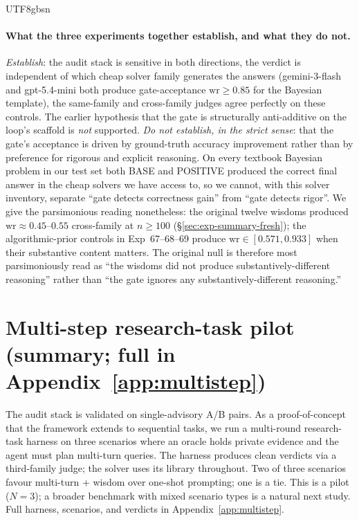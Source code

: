 \documentclass{article}
\begin{document}
\begin{CJK*}{UTF8}{gbsn}
\paragraph{What the three experiments together establish, and
what they do not.} \emph{Establish}: the audit stack is
sensitive in both directions, the verdict is independent of
which cheap solver family generates the answers
(gemini-3-flash and gpt-5.4-mini both produce gate-acceptance
\(\mathrm{wr} \geq 0.85\) for the Bayesian template), the
same-family and cross-family judges agree perfectly on these
controls. The earlier hypothesis that the gate is structurally
anti-additive on the loop's scaffold is \emph{not} supported.
\emph{Do not establish, in the strict sense}: that the gate's
acceptance is driven by ground-truth accuracy improvement
rather than by preference for rigorous and explicit
reasoning. On every textbook Bayesian problem in our test set
both BASE and POSITIVE produced the correct final answer in
the cheap solvers we have access to, so we cannot, with this
solver inventory, separate ``gate detects correctness gain''
from ``gate detects rigor''. We give the parsimonious reading
nonetheless: the original twelve wisdoms produced
\(\mathrm{wr} \approx 0.45\)--\(0.55\) cross-family at
\(n \geq 100\) (\S\ref{sec:exp-summary-fresh}); the
algorithmic-prior controls in Exp~67--68--69 produce
\(\mathrm{wr} \in [0.571, 0.933]\) when their substantive
content matters. The original null is therefore most
parsimoniously read as ``the wisdoms did not produce
substantively-different reasoning'' rather than ``the gate
ignores any substantively-different reasoning.''

\section{Multi-step research-task pilot (summary;
full in Appendix~\ref{app:multistep})}
\label{sec:multistep}

The audit stack is validated on single-advisory A/B pairs. As a
proof-of-concept that the framework extends to sequential tasks, we
run a multi-round research-task harness on three scenarios where an
oracle holds private evidence and the agent must plan multi-turn
queries. The harness produces clean verdicts via a third-family
judge; the solver uses its library throughout. Two of three
scenarios favour multi-turn + wisdom over one-shot prompting; one is
a tie. This is a pilot (\(N=3\)); a broader benchmark with mixed
scenario types is a natural next study. Full harness, scenarios, and
verdicts in Appendix~\ref{app:multistep}.


\end{CJK*}
\end{document}
